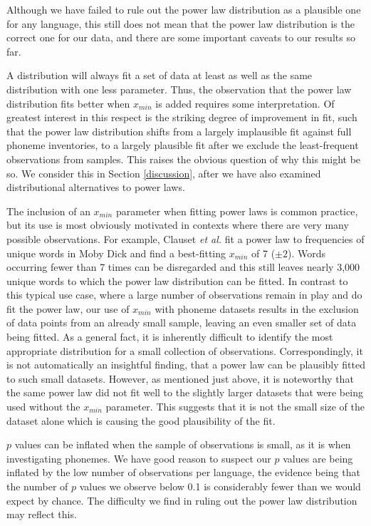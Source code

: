 Although we have failed to rule out the power law distribution as a plausible one for any language, this still does not mean that the power law distribution is the correct one for our data, and there are some important caveats to our results so far.

A distribution will always fit a set of data at least as well as the same distribution with one less parameter. Thus, the observation that the power law distribution fits better when \(x_{min}\) is added requires some interpretation. Of greatest interest in this respect is the striking degree of improvement in fit, such that the power law distribution shifts from a largely implausible fit against full phoneme inventories, to a largely plausible fit after we exclude the least-frequent observations from samples. This raises the obvious question of why this might be so. We consider this in Section \ref{discussion}, after we have also examined distributional alternatives to power laws.

The inclusion of an \(x_{min}\) parameter when fitting power laws is common practice, but its use is most obviously motivated in contexts where there are very many possible observations. For example, Clauset \emph{et al.} \autocite*[p.~684]{clauset_power-law_2009} fit a power law to frequencies of unique words in Moby Dick and find a best-fitting \(x_{min}\) of 7 (\(\pm2\)). Words occurring fewer than 7 times can be disregarded and this still leaves nearly 3,000 unique words to which the power law distribution can be fitted. In contrast to this typical use case, where a large number of observations remain in play and do fit the power law, our use of \(x_{min}\) with phoneme datasets results in the exclusion of data points from an already small sample, leaving an even smaller set of data being fitted. As a general fact, it is inherently difficult to identify the most appropriate distribution for a small collection of observations. Correspondingly, it is not automatically an insightful finding, that a power law can be plausibly fitted to such small datasets. However, as mentioned just above, it is noteworthy that the same power law did not fit well to the slightly larger datasets that were being used without the \(x_{min}\) parameter. This suggests that it is not the small size of the dataset alone which is causing the good plausibility of the fit.

\(p\) values can be inflated when the sample of observations is small, as it is when investigating phonemes. We have good reason to suspect our \(p\) values are being inflated by the low number of observations per language, the evidence being that the number of \(p\) values we observe below 0.1 is considerably fewer than we would expect by chance. The difficulty we find in ruling out the power law distribution may reflect this.

